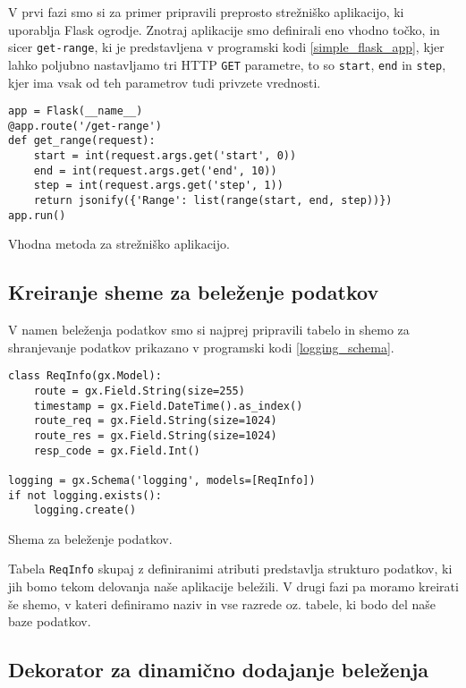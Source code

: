 \documentclass[a4paper,12pt,openright]{book}
\begin{document}
    V prvi fazi smo si za primer pripravili preprosto strežniško aplikacijo, ki uporablja Flask \cite{FLASK_GITHUB} ogrodje. Znotraj aplikacije smo definirali eno vhodno točko, in sicer {\tt get-range}, ki je predstavljena v programski kodi \ref{simple_flask_app}, kjer lahko poljubno nastavljamo tri HTTP {\tt GET} parametre, to so {\tt start}, {\tt end} in {\tt step}, kjer ima vsak od teh parametrov tudi privzete vrednosti.

\begin{code}
\begin{verbatim}
app = Flask(__name__)
@app.route('/get-range')
def get_range(request):
    start = int(request.args.get('start', 0))
    end = int(request.args.get('end', 10))
    step = int(request.args.get('step', 1))
    return jsonify({'Range': list(range(start, end, step))})
app.run()
\end{verbatim}
\caption{Vhodna metoda za strežniško aplikacijo.}
\label{simple_flask_app}
\end{code}

    \subsection{Kreiranje sheme za beleženje podatkov}

    V namen beleženja podatkov smo si najprej pripravili tabelo in shemo za shranjevanje podatkov prikazano v programski kodi \ref{logging_schema}.

\begin{code}
\begin{verbatim}
class ReqInfo(gx.Model):
    route = gx.Field.String(size=255)
    timestamp = gx.Field.DateTime().as_index()
    route_req = gx.Field.String(size=1024)
    route_res = gx.Field.String(size=1024)
    resp_code = gx.Field.Int()

logging = gx.Schema('logging', models=[ReqInfo])
if not logging.exists():
    logging.create()
\end{verbatim}
\caption{Shema za beleženje podatkov.}
\label{logging_schema}
\end{code}

    \noindent
    Tabela {\tt ReqInfo} skupaj z definiranimi atributi predstavlja strukturo podatkov, ki jih bomo tekom delovanja naše aplikacije beležili. V drugi fazi pa moramo kreirati še shemo, v kateri definiramo naziv in vse razrede oz. tabele, ki bodo del naše baze podatkov.

    \subsection{Dekorator za dinamično dodajanje beleženja}
\end{document}
